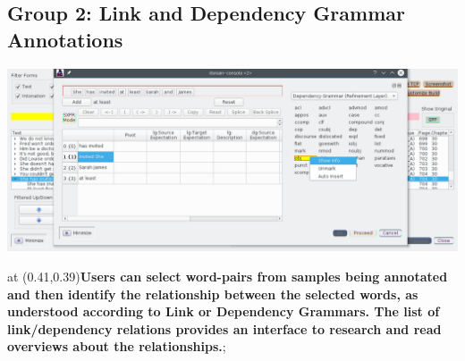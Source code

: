 \atsptt
    \begin{frame}{}
\section{Group 2: Link and Dependency Grammar Annotations}

        \begin{annotatedFigure}{0pt}{0pt}
            {\includegraphics[scale=1]{texs/trilink.png}}
            
  \node [text width=7cm,inner sep=14pt,align=justify,%
  draw opacity=0.9,line width=2mm, fill opacity=0.9,
  draw = logoCyan!50!brown,
  top color=brown!20,text=black,
  bottom color=logoCyan!2,
  rounded corners=6pt]
   at (0.41,0.39){\annfont\textbf{Users can select word-pairs 
   from samples being annotated and then identify 
   the relationship between the selected words, as understood 
   according to Link or Dependency Grammars.  The 
   list of link/dependency relations provides 
   an interface to research and read overviews about the 
   relationships.}};



            
  

  
        \end{annotatedFigure}

\end{frame}

